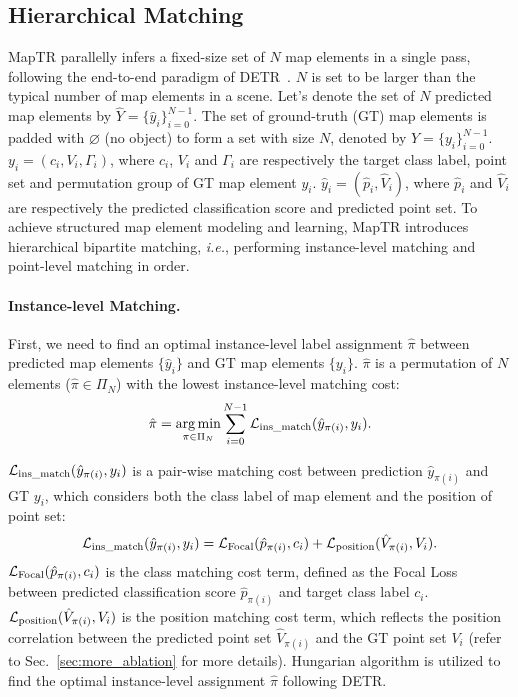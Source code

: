\documentclass{article} \usepackage{iclr2023_conference,times}
\DeclareMathOperator*{\argmin}{arg\,min}
\def\ie{\emph{i.e.}} \def\Ie{\emph{I.e.}}
\begin{document}
\subsection{Hierarchical Matching\label{matching}}
MapTR parallelly infers a fixed-size set of $N$ map elements in a single pass, following the end-to-end paradigm of DETR~\citep{detr,yolos}. $N$ is set to be larger than the typical number of map elements in a scene. Let's denote the set of $N$ predicted map elements by $\hat{Y} = \{\hat{y}_i \}_{i=0}^{N-1}$. 
The set of ground-truth (GT) map elements is padded with $\varnothing$ (no object) to form a set with size $N$, denoted by $Y=\{y_i\}_{i=0}^{N-1}$.
$y_i=(c_i, V_i, \Gamma_i)$, where $c_i$, $V_i$ and $\Gamma_i$ are respectively the target class label, point set and permutation group of GT map element $y_i$. $\hat{y}_i=(\hat{p}_i, \hat{V}_i)$, where $\hat{p}_i$ and $\hat{V}_i$ are respectively the predicted classification score and predicted point set.
To achieve structured map element modeling and learning,
MapTR introduces hierarchical bipartite matching, \ie,  performing instance-level matching and point-level matching in order.


\paragraph{Instance-level Matching.\label{sec:ins-lvl-matching}}

First, we need to find an optimal instance-level label assignment $\hat{\pi}$ between predicted map elements $\{\hat{y}_i \}$ and GT map elements $\{y_i \}$.  $\hat{\pi}$ is a permutation of $N$ elements ($\hat{\pi} \in \Pi_N$) with the lowest instance-level matching cost:
\begin{equation}
\begin{gathered}
\hat{\pi} = \argmin_{\pi \in \Pi_N} \sum_{i=0}^{N-1} \mathcal{L}_{\rm ins\_match} (\hat{y}_{\pi(i)}, y_i). \label{eq:argmin_inst_loss}
\end{gathered}
\end{equation}

$\mathcal{L}_{\rm ins\_match}(\hat{y}_{\pi(i)}, y_i)$ is a pair-wise matching cost between prediction $\hat{y}_{\pi(i)}$ and GT $y_i$, which  considers both the class label of map element and the position of point set:
\begin{equation}
\begin{gathered}
\mathcal{L}_{\rm ins\_match}(\hat{y}_{{\pi}(i)},  y_i ) =
\mathcal{L}_{\rm{Focal}}(\hat{p}_{{\pi}(i)}, c_i) + \mathcal{L}_{\rm position}(\hat{V}_{\pi(i)}, V_i).
\end{gathered}
\end{equation}
$\mathcal{L}_{\rm{Focal}}(\hat{p}_{{\pi}(i)}, c_i)$ is the class matching cost term, defined as the Focal Loss~\citep{focal} between predicted classification score $\hat{p}_{{\pi}(i)}$ and target class label $c_i$.
$\mathcal{L}_{\rm position}(\hat{V}_{\pi(i)}, V_i)$ is the position matching cost term, which reflects the position correlation between the predicted point set $\hat{V}_{\pi(i)}$ and the GT point set $V_i$ (refer to Sec.~\ref{sec:more_ablation} for more details). 
Hungarian algorithm is utilized to find the optimal instance-level assignment $\hat{\pi}$ following DETR.
\end{document}
